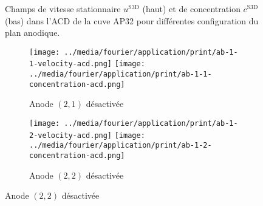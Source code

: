 \begin{figure}[h]
\begin{center}
    \caption{Champs de vitesse stationnaire $u^{\mathrm{S3D}}$ (haut) et de
      concentration $c^\mathrm{S3D}$ (bas) dans l'ACD de la cuve
      AP32 pour différentes configuration du plan anodique.}
    \label{fig:f3d-deactivated-a}
  \end{center}
\end{figure}

\begin{figure}[h]
  \begin{center}
    \begin{subfigure}[t]{\textwidth}
      \begin{center}
        \texttt{[image: ../media/fourier/application/print/ab-1-1-velocity-acd.png]}
        \texttt{[image: ../media/fourier/application/print/ab-1-1-concentration-acd.png]}
        \caption{Anode $(2,1)$ désactivée}
      \end{center}
    \end{subfigure}
    \begin{subfigure}[t]{\textwidth}
      \begin{center}
        \texttt{[image: ../media/fourier/application/print/ab-1-2-velocity-acd.png]}
        \texttt{[image: ../media/fourier/application/print/ab-1-2-concentration-acd.png]}
        \caption{Anode $(2,2)$ désactivée}
      \end{center}
    \end{subfigure}


\end{center}
\end{figure}
